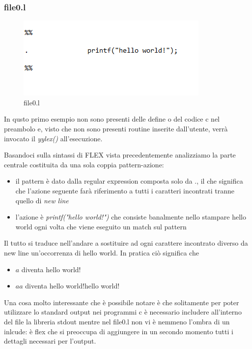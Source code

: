 \documentclass[class=book, crop=false, oneside, 12pt]{standalone}
\begin{document}
\subsubsection{file0.l}
        
\begin{figure}[h]
    \centering
    \includegraphics[width=.7\textwidth,keepaspectratio]{file0.l.png}
    \caption{file0.l}
    \label{file0.l}
\end{figure}


In qusto primo esempio non sono presenti delle define o del codice c nel preambolo e, visto che non sono presenti routine inserite dall'utente, verrà invocato il \emph{yylex()} all'esecuzione.

Basandoci sulla sintassi di FLEX vista precedentemente analizziamo la parte centrale costituita da una sola coppia pattern-azione:
\begin{itemize}
    \item il pattern è dato dalla regular expression composta solo da ., il che significa che l'azione seguente farà riferimento a tutti i caratteri incontrati tranne quello di \emph{new line}
    \item l'azione è \emph{printf("hello world!")} che consiste banalmente nello stampare hello world ogni volta che viene eseguito un match sul pattern
\end{itemize}

Il tutto si traduce nell'andare a sostituire ad ogni carattere incontrato diverso da new line un'occorrenza di hello world. In pratica ciò significa che
\begin{itemize}
    \item \(a\) diventa hello world!
    \item \(aa\) diventa hello world!hello world!
\end{itemize}

Una cosa molto interessante che è possibile notare è che solitamente per poter utilizzare lo standard output nei programmi c è necessario includere all'interno del file la libreria stdout mentre nel file0.l non vi è nemmeno l'ombra di un inlcude: è flex che si preoccupa di aggiungere in un secondo momento tutti i dettagli necessari per l'output.
\end{document}
